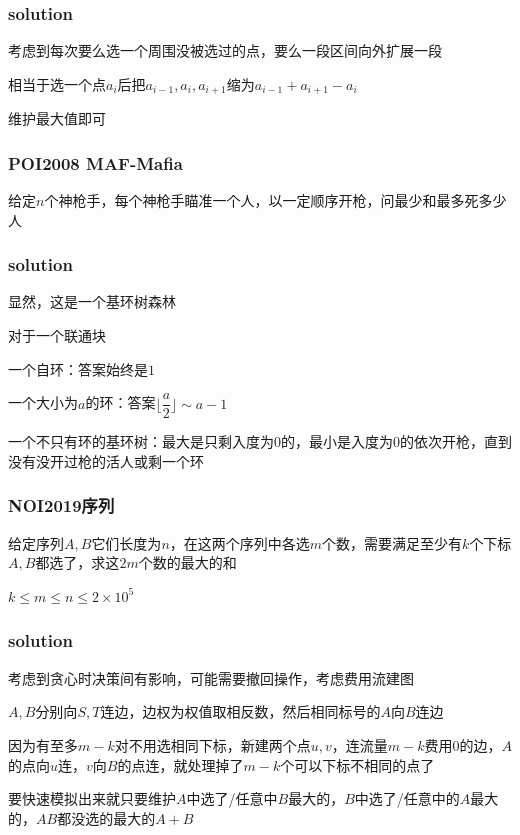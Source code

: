 \documentclass[10pt]{beamer}
\begin{document}
	\clearpage
	\begin{frame}
		\frametitle{solution}
		 考虑到每次要么选一个周围没被选过的点，要么一段区间向外扩展一段

		 相当于选一个点$a_i$后把$a_{i-1},a_i,a_{i+1}$缩为$a_{i-1}+a_{i+1}-a_i$

		 维护最大值即可
	\end{frame}
	\clearpage
	\begin{frame}
		\frametitle{POI2008 MAF-Mafia}
		\par 给定$n$个神枪手，每个神枪手瞄准一个人，以一定顺序开枪，问最少和最多死多少人
	\end{frame}
	\clearpage
	\begin{frame}
		\frametitle{solution}
		 显然，这是一个基环树森林

		 对于一个联通块
		
		 一个自环：答案始终是$1$

		 一个大小为$a$的环：答案$\lfloor\dfrac a2\rfloor\sim a-1$

		 一个不只有环的基环树：最大是只剩入度为$0$的，最小是入度为$0$的依次开枪，直到没有没开过枪的活人或剩一个环
	\end{frame}
	\clearpage
	\begin{frame}
		\frametitle{NOI2019序列}
		\par 给定序列$A,B$它们长度为$n$，在这两个序列中各选$m$个数，需要满足至少有$k$个下标$A,B$都选了，求这$2m$个数的最大的和
		\par $k\le m\le n\le 2\times 10^5$
	\end{frame}
	\clearpage
	\begin{frame}
		\frametitle{solution}
		 考虑到贪心时决策间有影响，可能需要撤回操作，考虑费用流建图

		 $A,B$分别向$S,T$连边，边权为权值取相反数，然后相同标号的$A$向$B$连边

		 因为有至多$m-k$对不用选相同下标，新建两个点$u,v$，连流量$m-k$费用$0$的边，$A$的点向$u$连，$v$向$B$的点连，就处理掉了$m-k$个可以下标不相同的点了

		 要快速模拟出来就只要维护$A$中选了/任意中$B$最大的，$B$中选了/任意中的$A$最大的，$AB$都没选的最大的$A+B$
	\end{frame}
	\clearpage
\end{document}
